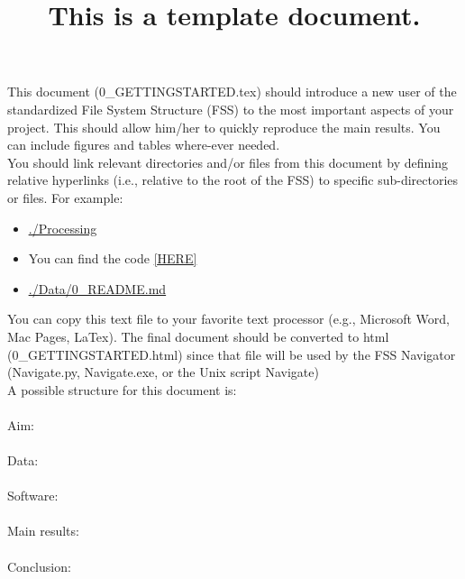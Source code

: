 ﻿\documentclass[12pt]{article}
\title{This is a template document.}
\begin{document}
\maketitle

This document (0\_GETTINGSTARTED.tex) should introduce a new user of the standardized File System Structure (FSS) to the most important aspects of your project. This should allow him/her to quickly reproduce the main results. You can include figures and tables where-ever needed. \\ 

You should link relevant directories and/or files from this document by defining relative hyperlinks (i.e., relative to the root of the FSS) to specific sub-directories or files. For example:
\begin{itemize}
  \item \href{file:./Processing}{\underline{./Processing}}
  \item You can find the code \href{file:./Processing}{[\underline{HERE}]}
  \item \href{file:./Data/0\_README.md}{\underline{./Data/0\_README.md}}
\end{itemize}


You can copy this text file to your favorite text processor (e.g., Microsoft Word, Mac Pages, LaTex). The final document should be converted to html (0\_GETTINGSTARTED.html) since that file will be used by the FSS Navigator (Navigate.py, Navigate.exe, or the Unix script Navigate) \\

A possible structure for this document is:
\\ \\
Aim:
\\ \\
Data:
\\ \\ 
Software:
\\ \\
Main results:
\\ \\
Conclusion:
\\
\end{document}

